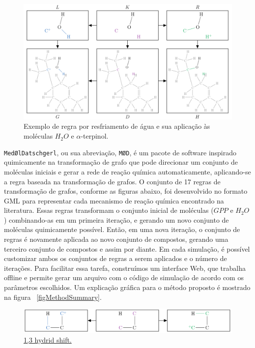 \begin{figure}[htbp]
	\centering
	\includegraphics[width=\linewidth]{images/quenchingByWater.png}
	\caption{{Exemplo de regra por resfriamento de água e sua aplicação às moléculas $H_2O$ e $\alpha$-terpinol.}}
	\label{figRuleExample}
\end{figure}


\texttt{Med{\O}lDatschgerl}, ou  sua abreviação, \texttt{M{\O}D}, é um pacote de software inspirado quimicamente na transformação de grafo que pode direcionar um conjunto de moléculas iniciais e gerar a rede de reação química automaticamente, aplicando-se a regra baseada na transformação de grafos.  O conjunto de 17 regras de transformação de grafos, conforme as figuras abaixo, foi desenvolvido no formato GML para representar cada mecanismo de reação química encontrado na literatura. 
Essas regras transformam o conjunto inicial de moléculas ($GPP$ e $H_2O$) combinando-as em um primeira iteração, e gerando um novo conjunto de moléculas quimicamente possível. Então, em uma nova iteração, o conjunto de regras é novamente aplicada ao novo conjunto de compostos, gerando uma terceiro conjunto de compostos e assim por diante. Em cada simulação, é possível customizar ambos os conjuntos de regras a serem aplicados e o número de iterações. Para facilitar essa tarefa, construímos um interface Web, que trabalha offline e permite gerar um arquivo com o código de simulação de acordo com os parâmetros escolhidos. Um explicação gráfica para o método proposto é mostrado na figura ~\ref{figMethodSummary}.

\begin{figure}[H]
	\centering
	\includegraphics[width=.86\linewidth]{images/r1.png}
	\caption{\href{https://github.com/waldeyr/2PathTerpenes/blob/master/rules/1-3Hshift.gml}{1,3 hydrid shift.}}
	\label{figRule}
\end{figure}

